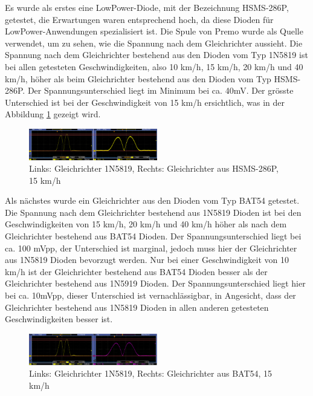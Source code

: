 Es wurde als erstes eine LowPower-Diode, mit der Bezeichnung HSMS-286P, getestet, die Erwartungen waren entsprechend hoch, da diese Dioden für LowPower-Anwendungen spezialisiert ist. Die Spule von Premo wurde als Quelle verwendet, um zu sehen, wie die Spannung nach dem Gleichrichter aussieht. Die Spannung nach dem Gleichrichter bestehend aus den Dioden vom Typ 1N5819 ist bei allen getesteten Geschwindigkeiten, also 10 km/h, 15 km/h, 20 km/h und 40 km/h, höher als beim Gleichrichter bestehend aus den Dioden vom Typ HSMS-286P. Der Spannungsunterschied liegt im Minimum bei ca. 40mV. Der grösste Unterschied ist bei der Geschwindigkeit von 15 km/h ersichtlich, was in der Abbildung \ref{messung_optimierung_gleichrichter_1} gezeigt wird.

\begin{figure}[ht]
    \includegraphics[width=0.5\textwidth]{3Vorgehen/imag/Messung_Optimierung_Gleichrichter_1.png}
    \caption{Links: Gleichrichter 1N5819, Rechts: Gleichrichter aus HSMS-286P, 15 km/h}
    \label{messung_optimierung_gleichrichter_1} 
\end{figure}

Als nächstes wurde ein Gleichrichter aus den Dioden vom Typ BAT54 getestet. Die Spannung nach dem Gleichrichter bestehend aus 1N5819 Dioden ist bei den Geschwindigkeiten von 15 km/h, 20 km/h und 40 km/h höher als nach dem Gleichrichter bestehend aus BAT54 Dioden. Der Spannungsunterschied liegt bei ca. 100 mVpp, der Unterschied ist marginal, jedoch muss hier der Gleichrichter aus 1N5819 Dioden bevorzugt werden. Nur bei einer Geschwindigkeit von 10 km/h ist der Gleichrichter bestehend aus BAT54 Dioden besser als der Gleichrichter bestehend aus 1N5919 Dioden. Der Spannungsunterschied liegt hier bei ca. 10mVpp, dieser Unterschied ist vernachlässigbar, in Angesicht, dass der Gleichrichter bestehend aus 1N5819 Dioden in allen anderen getesteten Geschwindigkeiten besser ist.

\begin{figure}[ht]
    \includegraphics[width=0.5\textwidth]{3Vorgehen/imag/Messung_Optimierung_Gleichrichter_2.png}
    \caption{Links: Gleichrichter 1N5819, Rechts: Gleichrichter aus BAT54, 15 km/h}
    \label{messung_optimierung_gleichrichter_2} 
\end{figure}


